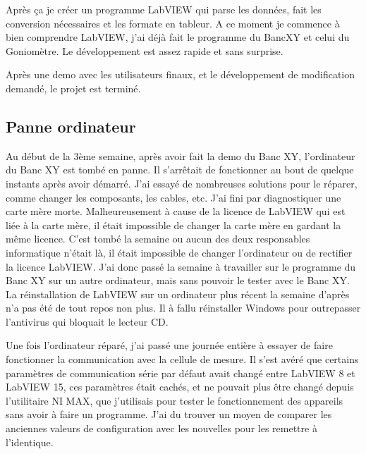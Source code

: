 \documentclass[12pt]{article}
\begin{document}
Après ça je créer un programme LabVIEW qui parse les données, fait les conversion nécessaires et les formate en tableur.
A ce moment je commence à bien comprendre LabVIEW, j'ai déjà fait le programme du BancXY et celui du Goniomètre.
Le développement est assez rapide et sans surprise.

Après une demo avec les utilisateurs finaux, et le développement de modification demandé, le projet est terminé.

\subsection{ Panne ordinateur }

Au début de la 3ème semaine, après avoir fait la demo du Banc XY, l'ordinateur du Banc XY est tombé en panne.
Il s'arrêtait de fonctionner au bout de quelque instants après avoir démarré.
J'ai essayé de nombreuses solutions pour le réparer, comme changer les composants, les cables, etc.
J'ai fini par diagnostiquer une carte mère morte.
Malheureusement à cause de la licence de LabVIEW qui est liée à la carte mère, il était impossible de changer la carte mère en gardant la même licence.
C'est tombé la semaine ou aucun des deux responsables informatique n'était là, il était impossible de changer l'ordinateur ou de rectifier la licence LabVIEW.
J'ai donc passé la semaine à travailler sur le programme du Banc XY sur un autre ordinateur, mais sans pouvoir le tester avec le Banc XY.
La réinstallation de LabVIEW sur un ordinateur plus récent la semaine d'après n'a pas été de tout repos non plus.
Il à fallu réinstaller Windows pour outrepasser l'antivirus qui bloquait le lecteur CD.

Une fois l'ordinateur réparé, j'ai passé une journée entière à essayer de faire fonctionner la communication avec la cellule de mesure.
Il s'est avéré que certains paramètres de communication série par défaut avait changé entre LabVIEW 8 et LabVIEW 15, ces paramètres était cachés, et ne pouvait plus être changé depuis l'utilitaire NI MAX, que j'utilisais pour tester le fonctionnement des appareils sans avoir à faire un programme.
J'ai du trouver un moyen de comparer les anciennes valeurs de configuration avec les nouvelles pour les remettre à l'identique.








		
\end{document}
